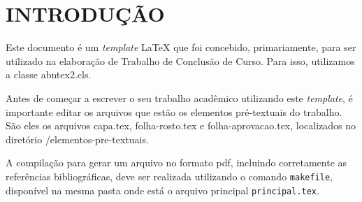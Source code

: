 
\chapter{INTRODUÇÃO}
\label{chap:introducao}

Este documento é um \emph{template} \LaTeX{} que foi concebido, primariamente, para ser utilizado na elaboração de Trabalho de Conclusão de Curso. Para isso, utilizamos a classe {\ttfamily abntex2.cls}.

Antes de começar a escrever o seu trabalho acadêmico utilizando este \emph{template}, é importante editar os arquivos que estão os elementos pré-textuais do trabalho.
São eles os arquivos {\ttfamily capa.tex}, {\ttfamily folha-rosto.tex} e {\ttfamily folha-aprovacao.tex}, localizados no diretório  {\ttfamily /elementos-pre-textuais}.

A compilação para gerar um arquivo no formato pdf, incluindo corretamente as referências bibliográficas, deve ser realizada utilizando o comando \verb|makefile|, disponível na mesma pasta onde está o arquivo principal \verb|principal.tex|.

